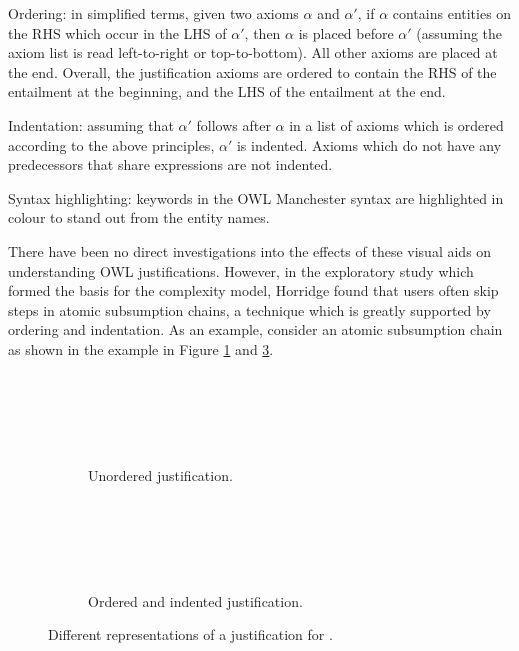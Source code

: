 \begin{compactitem}
\item Ordering: in simplified terms, given two axioms $\alpha$ and $\alpha'$, if $\alpha$ contains entities on the RHS which occur in the LHS of $\alpha'$, then $\alpha$ is placed before $\alpha'$ (assuming the axiom list is read left-to-right or top-to-bottom). All other axioms are placed at the end. Overall, the justification axioms are ordered to contain the RHS of the entailment at the beginning, and the LHS of the entailment at the end.
\item Indentation: assuming that $\alpha'$ follows after $\alpha$ in a list of axioms which is ordered according to the above principles, $\alpha'$ is indented. Axioms which do not have any predecessors that share expressions are not indented.
\item Syntax highlighting: keywords in the OWL Manchester syntax are highlighted in colour to stand out from the entity names.
\end{compactitem}

There have been no direct investigations into the effects of these visual aids on understanding OWL justifications. However, in the exploratory study which formed the basis for the complexity model, Horridge \cite{horridge11ab} found that users often skip steps in atomic subsumption chains, a technique which is greatly supported by ordering and indentation. As an example, consider an atomic subsumption chain as shown in the example in Figure \ref{fig:orderinga} and \ref{fig:orderingb}.


\begin{figure}
\centering
		\begin{subfigure}{0.4\textwidth}
        \centering 
		 \\
		\\
		\\
		  \\
		\caption{Unordered justification.}\label{fig:orderinga} 
        \end{subfigure}%
		\begin{subfigure}{0.5\textwidth}
        \centering 
		\\
		\quad {}\\
		\quad \quad {} \\
		\quad \quad \quad {} \\
		\quad \quad \quad \quad {}
    	\caption{Ordered and indented justification.}\label{fig:orderingb}  
        \end{subfigure}    
     \caption{Different representations of a justification for .}
\end{figure}


